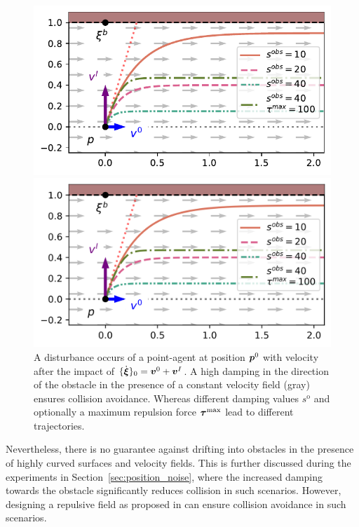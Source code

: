 \begin{figure}[htb]
\centering
 \iflong
  \centerline{\includegraphics[width=0.99\columnwidth]{figures/parallel_avoidance_obstacle.pdf}}
  \else
  \centerline{\includegraphics[width=0.99\columnwidth]{figures/parallel_avoidance_obstacle.png}}
  \fi
  \caption{A disturbance occurs of a point-agent at position $\boldsymbol{p}^0$ with velocity after the impact of $\{ \dot{\boldsymbol{\xi}} \}_0 = \boldsymbol{v}^0 + \boldsymbol{v}^I$. A high damping in the direction of the obstacle in the presence of a constant velocity field (gray) ensures collision avoidance. Whereas different damping values $s^{\mathrm{o}}$ and optionally a maximum repulsion force $\boldsymbol{\tau}^{\mathrm{max}}$ lead to different trajectories.}
  \label{fig:disturbance_with_parallel_velocity}
\end{figure}
    
Nevertheless, there is no guarantee against drifting into obstacles in the presence of highly curved surfaces and velocity fields. \iflong This is further discussed during the experiments in Section~\ref{sec:position_noise}, where the increased damping towards the obstacle significantly reduces collision in such scenarios. \fi However, designing a repulsive field as proposed in \parencite{huber2023avoidance} can ensure collision avoidance in such scenarios.


